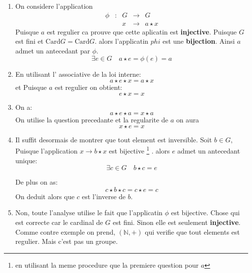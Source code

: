 \documentclass{report}
\begin{document}
\begin{myproof}
  \begin{enumerate}
    \item On considere l'application
      $$
      \begin{array}{lllll}
        \phi & : & G & \longrightarrow & G\\
             &   & x & \longrightarrow & a \star x
      \end{array}
      $$
      Puisque $a$ est regulier ca prouve que cette aplicatin est \textbf{injective}. Puisque $G$ est fini et $\text{Card} G = \text{Card} G$. alors l'applicatin $phi$ est une \textbf{bijection}.
      Ainsi $a$ admet un antecedant par $\phi$.
      $$
      \exists e \in G \quad a \star e = \phi(e) = a
      $$
    \item En utilisant l' associative de la loi interne:
      $$
      a \star e \star x = a \star x 
      $$
      et Puisque $a$ est regulier on obtient:
      $$
      e \star x = x
      $$
    \item On a:
      $$
      a \star e \star a = x \star a
      $$
      On utilise la question precedante et la regularite de $a$ on aura
      $$
      x \star e = x
      $$
    \item Il suffit desormais de montrer que tout element est inversible. Soit $b\in G$, Puisque l'application $x \rightarrow b \star x$  est bijective \footnote{en utilisant la meme procedure que la premiere question pour $a$} . alors $e$ admet un antecedant unique:
      $$
      \exists c \in G \quad b \star c = e
      $$
      
      De plus on as:
      $$
      c \star b \star c = c \star e = c
      $$
      On deduit alors que $c$ est l'inverse de $b$.
    \item Non, toute l'analyse utilise le fait que l'applicatin $\phi$ est bijective. Chose qui est correcte car le cardinal de $G$ est fini. Sinon elle est seulement \textbf{injective}. Comme contre exemple on prend, $(\mathbb{N}, +)$ qui verifie que tout elements est regulier. Mais c'est pas un groupe.
  \end{enumerate}

\end{myproof}

\end{document}
